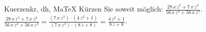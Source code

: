 \begin{MAufgabe}{Kuerzen}{kr, dh, MaTeX}
K\"urzen Sie soweit m\"oglich: $\frac{28\, x\, z^5 + 7\, x\, z^3}{56\, x\, z^4 + 56\, x\, z^3}$.\\ 
\ifLsg\MLoesung
\quad $\frac{28\, x\, z^5 + 7\, x\, z^3}{56\, x\, z^4 + 56\, x\, z^3}=\frac{(7\, x\, z^3)\cdot(4\, z^2 + 1)}{(7\, x\, z^3)\cdot(8\, z + 8)}=\frac{4\, z^2 + 1}{8\, z + 8}$.\else\relax\fi
 \end{MAufgabe}